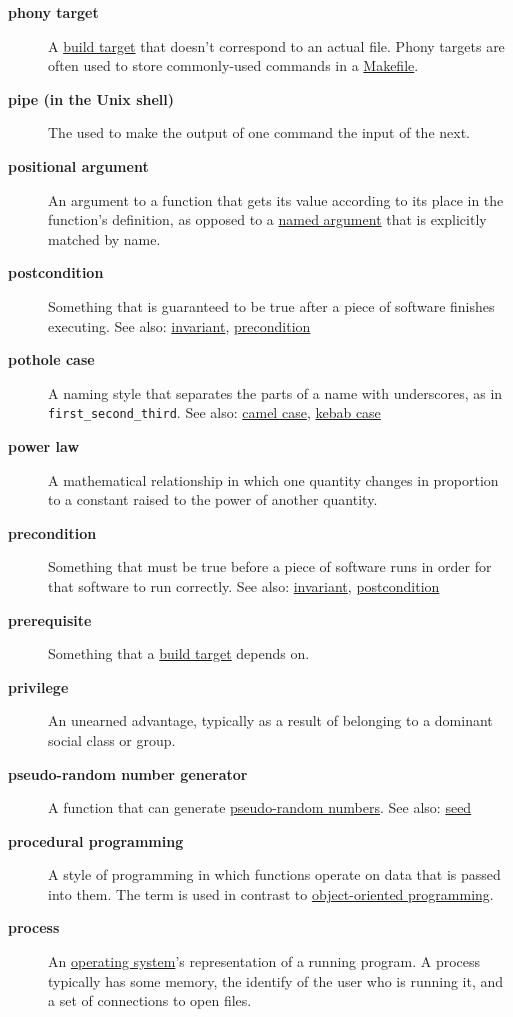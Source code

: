 \documentclass[
]{krantz}
\begin{document}
\begin{description}
\item[\textbf{phony target}]
A \protect\hyperlink{build_target}{build target} that doesn't correspond to an actual file. Phony targets are often used to store commonly-used commands in a \protect\hyperlink{makefile}{Makefile}.
\item[\textbf{pipe (in the Unix shell)}]
The \texttt{\textbar{}} used to make the output of one command the input of the next.
\item[\textbf{positional argument}]
An argument to a function that gets its value according to its place in the function's definition, as opposed to a \protect\hyperlink{named_argument}{named argument} that is explicitly matched by name.
\item[\textbf{postcondition}]
Something that is guaranteed to be true after a piece of software finishes executing. See also: \protect\hyperlink{invariant}{invariant}, \protect\hyperlink{precondition}{precondition}
\item[\textbf{pothole case}]
A naming style that separates the parts of a name with underscores, as in \texttt{first\_second\_third}. See also: \protect\hyperlink{camel_case}{camel case}, \protect\hyperlink{kebab_case}{kebab case}
\item[\textbf{power law}]
A mathematical relationship in which one quantity changes in proportion to a constant raised to the power of another quantity.
\item[\textbf{precondition}]
Something that must be true before a piece of software runs in order for that software to run correctly. See also: \protect\hyperlink{invariant}{invariant}, \protect\hyperlink{postcondition}{postcondition}
\item[\textbf{prerequisite}]
Something that a \protect\hyperlink{build_target}{build target} depends on.
\item[\textbf{privilege}]
An unearned advantage, typically as a result of belonging to a dominant social class or group.
\item[\textbf{pseudo-random number generator}]
A function that can generate \protect\hyperlink{pseudo_random_number}{pseudo-random numbers}. See also: \protect\hyperlink{seed}{seed}
\item[\textbf{procedural programming}]
A style of programming in which functions operate on data that is passed into them. The term is used in contrast to \protect\hyperlink{oop}{object-oriented programming}.
\item[\textbf{process}]
An \protect\hyperlink{operating_system}{operating system}'s representation of a running program. A process typically has some memory, the identify of the user who is running it, and a set of connections to open files.

\end{description}
\end{document}
